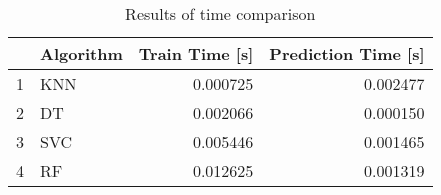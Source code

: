 \begin{table}
\footnotesize
\caption{Results of time comparison}
\label{tab:time comparison}
\begin{tabular}{llrr}
\hline
 & Algorithm & Train Time [s] & Prediction Time [s] \\
\hline
1 & KNN & 0.000725 & 0.002477 \\
2 & DT & 0.002066 & 0.000150 \\
3 & SVC & 0.005446 & 0.001465 \\
4 & RF & 0.012625 & 0.001319 \\
\hline
\end{tabular}
\end{table}
